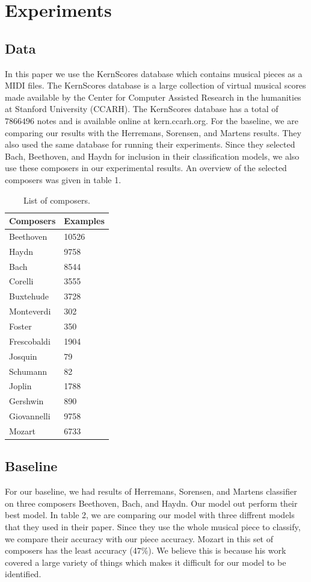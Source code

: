 \documentclass[11pt,a4paper]{article}
\begin{document}
\section{Experiments}

\subsection{Data}
In this paper we use the KernScores database which contains musical pieces as a MIDI files. The KernScores database is a large collection of virtual musical scores made available by the Center for Computer Assisted Research in the humanities at Stanford University (CCARH). The KernScores database has a total of $7866496$ notes and is available online at  kern.ccarh.org.
For the baseline, we are comparing our results with the Herremans, Sorensen, and Martens \cite {Herremans} results. They also used the same database for running their experiments. Since they selected Bach, Beethoven, and Haydn for inclusion in their classification models, we also use these composers in our experimental results. An overview of the selected composers was given in table 1.

\begin{table}[t!]
\begin{center}
\begin{tabular}{|l|l|}
\hline \bf Composers & \bf Examples \\ \hline
Beethoven & 10526 \\
Haydn & 9758 \\
Bach & 8544\\
Corelli & 3555\\
Buxtehude & 3728\\
Monteverdi & 302 \\
Foster & 350\\
Frescobaldi & 1904\\
Josquin & 79\\
Schumann & 82\\
Joplin & 1788\\
Gershwin & 890\\
Giovannelli & 9758\\
Mozart & 6733  \\
\hline
\end{tabular}
\end{center}
\caption{\label{composer-table}List of composers. }
\end{table}

\subsection{Baseline}
For our baseline, we had results of  Herremans, Sorensen, and Martens \cite {Herremans} classifier on three composers Beethoven, Bach, and Haydn. Our model out perform their best model. In table 2, we are comparing our model with three diffrent models that they used in their paper. Since they use the whole musical piece to classify, we compare their accuracy with our piece accuracy. Mozart in this set of composers has the least accuracy (47\%). We believe this is because his work covered a large variety of things which makes it difficult for our model to be identified.
\end{document}
